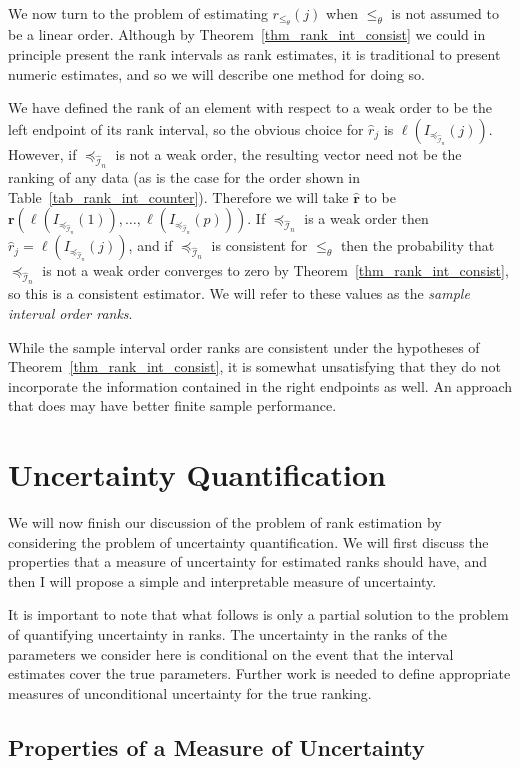 \documentclass[12pt]{article}
\newcommand{\pord}{{\leqslant_{\theta}}}
\newcommand{\iordn}{{\preceq_{\hat{\mathcal{I}}_{n}}}}
\numberwithin{theorem}{section}
\begin{document}
We now turn to the problem of estimating $r_\pord(j)$ when $\pord$ is not assumed to be a linear order.  Although by Theorem~\ref{thm_rank_int_consist} we could in principle present the rank intervals as rank estimates, it is traditional to present numeric estimates, and so we will describe one method for doing so.

We have defined the rank of an element with respect to a weak order to be the left endpoint of its rank interval, so the obvious choice for $\hat{r}_j$ is $\ell(I_\iordn(j))$.  However, if $\iordn$ is not a weak order, the resulting vector need not be the ranking of any data (as is the case for the order shown in Table~\ref{tab_rank_int_counter}).  Therefore we will take $\hat{\mathbf{r}}$ to be $\mathbf{r}(\ell(I_\iordn(1)), \dots, \ell(I_\iordn(p)))$.  If $\iordn$ is a weak order then $\hat{r}_j = \ell(I_\iordn(j))$, and if $\iordn$ is consistent for $\pord$ then the probability that $\iordn$ is not a weak order converges to zero by Theorem~\ref{thm_rank_int_consist}, so this is a consistent estimator.  We will refer to these values as the \emph{sample interval order ranks}.

While the sample interval order ranks are consistent under the hypotheses of Theorem~\ref{thm_rank_int_consist}, it is somewhat unsatisfying that they do not incorporate the information contained in the right endpoints as well.  An approach that does may have better finite sample performance.

\section{Uncertainty Quantification}
\label{sec_uncert_quant}
We will now finish our discussion of the problem of rank estimation by considering the problem of uncertainty quantification.  We will first discuss the properties that a measure of uncertainty for estimated ranks should have, and then I will propose a simple and interpretable measure of uncertainty.

It is important to note that what follows is only a partial solution to the problem of quantifying uncertainty in ranks.  The uncertainty in the ranks of the parameters we consider here is conditional on the event that the interval estimates cover the true parameters.  Further work is needed to define appropriate measures of unconditional uncertainty for the true ranking.

\subsection{Properties of a Measure of Uncertainty}
\label{subsec_measure_uncert_prop}
\end{document}
